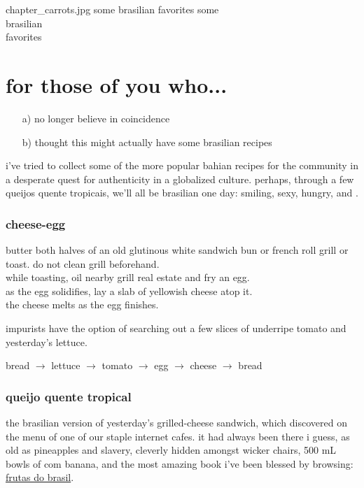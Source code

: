 \mychapter
{chapter_carrots.jpg}
{some brasilian favorites}
{some\\brasilian{}\\favorites}

\section{for those of you who...}

\begin{enumerate}
  \item[a)] no longer believe in coincidence
  \item[b)] thought this might actually have some brasilian recipes
\end{enumerate}

i've tried to collect some of the more popular bahian recipes for the
 community in a desperate quest for authenticity in a globalized
culture. perhaps, through a few queijos quente tropicais, we'll all be
brasilian one day: smiling, sexy, hungry, and .

\subsubsection{cheese-egg}

butter both halves of an old glutinous white sandwich bun or french
roll grill or toast. do not clean grill beforehand.\\
while toasting, oil nearby grill real estate and fry an egg.\\
as the egg solidifies, lay a slab of yellowish cheese atop it.\\
the cheese melts as the egg finishes.

impurists have the option of searching out a few slices of underripe
tomato and yesterday's lettuce.

bread $\rightarrow$ lettuce $\rightarrow$ tomato $\rightarrow$ egg
$\rightarrow$ cheese $\rightarrow$ bread

\subsubsection{queijo quente tropical}

the brasilian version of yesterday's grilled-cheese sandwich, which
 discovered on the menu of one of our staple internet cafes. it
had always been there i guess, as old as pineapples and slavery,
cleverly hidden amongst wicker chairs, 500 mL bowls of
 com banana, and the most amazing book i've been blessed by
browsing: \underline{\gls{frutas do brasil}}.

